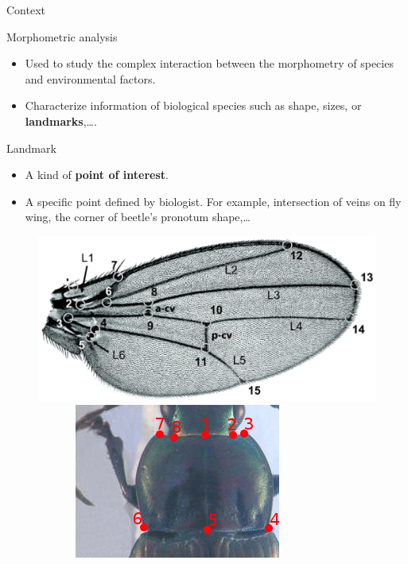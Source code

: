 \documentclass[10pt,svgnames]{beamer}
\begin{document}
\begin{frame}[t]{Context}
\begin{block}{Morphometric analysis}
  \begin{itemize}    
    \item Used to study the complex interaction between the morphometry of species and environmental factors.
    \item Characterize information of biological species such as shape, sizes, or \textbf{landmarks},\ldots.
  \end{itemize}
  \end{block}

  \begin{block}{Landmark}
  \begin{itemize}
     \item A kind of \textbf{point of interest}.
     \item A specific point defined by biologist. For example, intersection of veins on fly wing, the corner of beetle's pronotum shape,\ldots
  \end{itemize}
  	\begin{figure}[htbp]
       \centering
       \includegraphics[scale=.17]{images/wing}~~~~~~
       \includegraphics[scale=.3]{images/pronotum_lm}~~
	\end{figure}
  \end{block}
\end{frame}
\end{document}
